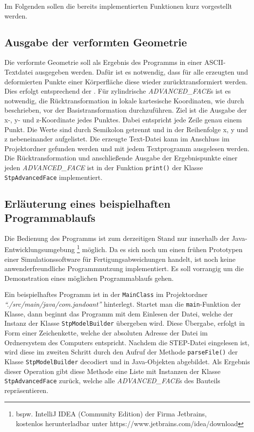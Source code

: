 Im Folgenden sollen die bereits implementierten Funktionen kurz vorgestellt werden. 



\subsection{Ausgabe der verformten Geometrie}

Die verformte Geometrie soll als Ergebnis des Programms in einer ASCII-Textdatei ausgegeben werden. Dafür ist es notwendig, dass für alle erzeugten und deformierten Punkte einer Körperfläche diese wieder zurücktransformiert werden. Dies erfolgt entsprechend der . Für zylindrische \textit{ADVANCED\_FACE}s ist es notwendig, die Rücktransformation in lokale kartesische Koordinaten, wie durch  beschrieben, vor der Basistransformation durchzuführen. 
Ziel ist die Ausgabe der x-, y- und z-Koordinate jedes Punktes. Dabei entspricht jede Zeile genau einem Punkt. Die Werte sind durch Semikolon getrennt und in der Reihenfolge x, y und z nebeneinander aufgelistet. Die erzeugte Text-Datei kann im Anschluss im Projektordner  gefunden werden und mit jedem Textprogramm ausgelesen werden. Die Rücktransformation und anschließende Ausgabe der Ergebnispunkte einer jeden \textit{ADVANCED\_FACE} ist in der Funktion \verb|print()| der Klasse \verb|StpAdvancedFace| implementiert.

\subsection{Erläuterung eines beispielhaften Programmablaufs}

Die Bedienung des Programms ist zum derzeitigen Stand nur innerhalb der Java-Ent\-wick\-lungs\-um\-geb\-ung \footnote{bspw. IntelliJ IDEA (Community Edition) der Firma Jetbrains,\\ kostenlos herunterladbar unter https://www.jetbrains.com/idea/download} möglich. Da es sich noch um einen frühen Prototypen einer Simulationssoftware für Fertigungsabweichungen handelt, ist noch keine anwenderfreundliche Programmnutzung implementiert. Es soll vorrangig um die Demonstration eines möglichen Programmablaufs gehen. 

Ein beispielhaftes Programm ist in der \verb|MainClass| im Projektordner \textit{"`./src/\-main/\-java/\-com.jandoant"'} hinterlegt. Startet man die \verb|main|-Funktion der Klasse, dann beginnt das Programm mit dem Einlesen der Datei, welche der Instanz der Klasse \verb|StpModelBuilder| übergeben wird. Diese Übergabe, erfolgt in Form einer Zeichenkette, welche der absoluten Adresse der Datei im Ordnersystem des Computers entspricht.
Nachdem die STEP-Datei eingelesen ist, wird diese im zweiten Schritt durch den Aufruf der Methode \verb|parseFile()| der Klasse \verb|StpModelBuilder| decodiert und in Java-Objekten abgebildet. Als Ergebnis dieser Operation gibt diese Methode eine Liste mit Instanzen der Klasse \verb|StpAdvancedFace| zurück, welche alle \textit{ADVANCED\_FACE}s des Bauteils repräsentieren.

